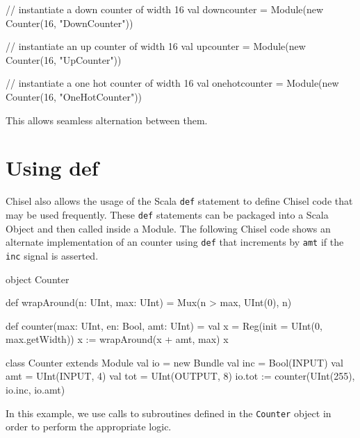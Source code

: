 \begin{scala}
// instantiate a down counter of width 16
val downcounter = 
  Module(new Counter(16, "DownCounter"))

// instantiate an up counter of width 16
val upcounter = 
  Module(new Counter(16, "UpCounter"))

// instantiate a one hot counter of width 16
val onehotcounter = 
  Module(new Counter(16, "OneHotCounter"))
\end{scala}

This allows seamless alternation between them.

\section{Using def}

Chisel also allows the usage of the Scala \verb+def+ statement to define Chisel code that may be used frequently. These \verb+def+ statements can be packaged into a Scala Object and then called inside a Module. The following Chisel code shows an alternate implementation of an counter using \verb+def+ that increments by \verb+amt+ if the \verb+inc+ signal is asserted.

\begin{scala} 
object Counter {
  def wrapAround(n: UInt, max: UInt) = 
    Mux(n > max, UInt(0), n)

  def counter(max: UInt, en: Bool, amt: UInt) = {
    val x = Reg(init = UInt(0, max.getWidth))
    x := wrapAround(x + amt, max)
    x
  }
}

class Counter extends Module {
  val io = new Bundle {
    val inc = Bool(INPUT)
    val amt = UInt(INPUT,  4)
    val tot = UInt(OUTPUT, 8)
  }
  io.tot := counter(UInt(255), io.inc, io.amt)
}
\end{scala}
 
\noindent
In this example, we use calls to subroutines defined in the \verb+Counter+ object in order to perform the appropriate logic. 

